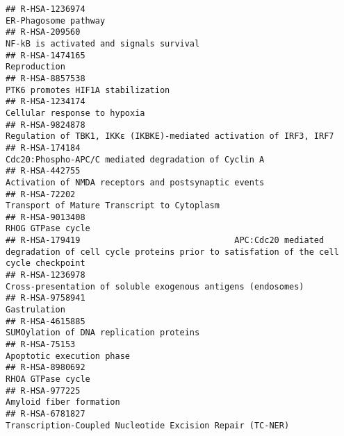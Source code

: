 \documentclass[
]{article}
\begin{document}
\begin{verbatim}
## R-HSA-1236974                                                                                                                 ER-Phagosome pathway
## R-HSA-209560                                                                                               NF-kB is activated and signals survival
## R-HSA-1474165                                                                                                                         Reproduction
## R-HSA-8857538                                                                                                    PTK6 promotes HIF1A stabilization
## R-HSA-1234174                                                                                                         Cellular response to hypoxia
## R-HSA-9824878                                                                  Regulation of TBK1, IKKε (IKBKE)-mediated activation of IRF3, IRF7 
## R-HSA-174184                                                                                  Cdc20:Phospho-APC/C mediated degradation of Cyclin A
## R-HSA-442755                                                                                  Activation of NMDA receptors and postsynaptic events
## R-HSA-72202                                                                                            Transport of Mature Transcript to Cytoplasm
## R-HSA-9013408                                                                                                                    RHOG GTPase cycle
## R-HSA-179419                               APC:Cdc20 mediated degradation of cell cycle proteins prior to satisfation of the cell cycle checkpoint
## R-HSA-1236978                                                                         Cross-presentation of soluble exogenous antigens (endosomes)
## R-HSA-9758941                                                                                                                         Gastrulation
## R-HSA-4615885                                                                                              SUMOylation of DNA replication proteins
## R-HSA-75153                                                                                                              Apoptotic execution phase
## R-HSA-8980692                                                                                                                    RHOA GTPase cycle
## R-HSA-977225                                                                                                               Amyloid fiber formation
## R-HSA-6781827                                                                            Transcription-Coupled Nucleotide Excision Repair (TC-NER)

\end{verbatim}
\end{document}

